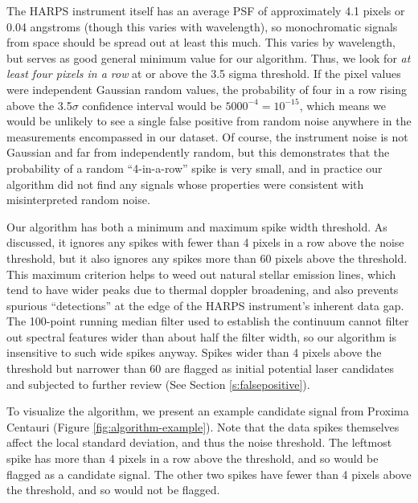 \documentclass[linenumbers]{aastex631}
\begin{document}
The HARPS instrument itself has an average PSF of approximately 4.1 pixels \citep{HARPS_specs} or 0.04 angstroms (though this varies with wavelength), so monochromatic signals from space should be spread out at least this much. This varies by wavelength, but serves as good general minimum value for our algorithm. Thus, we look for \emph{at least four pixels in a row} at or above the 3.5 sigma threshold.  If the pixel values were independent Gaussian random values, the probability of four in a row rising above the 3.5$\sigma$ confidence interval would be $5000^{-4}=10^{-15}$, which means we would be unlikely to see a single false positive from random noise anywhere in the measurements encompassed in our dataset. Of course, the instrument noise is not Gaussian and far from independently random, but this demonstrates that the probability of a random ``4-in-a-row'' spike is very small, and in practice our algorithm did not find any signals whose properties were consistent with misinterpreted random noise.

Our algorithm has both a minimum and maximum spike width threshold.  As discussed, it ignores any spikes with fewer than 4 pixels in a row above the noise threshold, but it also ignores any spikes more than 60 pixels above the threshold.  This maximum criterion helps to weed out natural stellar emission lines, which tend to have wider peaks due to thermal doppler broadening, and also prevents spurious ``detections'' at the edge of the HARPS instrument's inherent data gap. The 100-point running median filter used to establish the continuum cannot filter out spectral features wider than about half the filter width, so our algorithm is insensitive to such wide spikes anyway.  Spikes wider than 4 pixels above the threshold but narrower than 60 are flagged as initial potential laser candidates and subjected to further review (See Section \ref{s:falsepositive}).

To visualize the algorithm, we present an example candidate signal from  Proxima Centauri (Figure \ref{fig:algorithm-example}).  Note that the data spikes themselves affect the local standard deviation, and thus the noise threshold. The leftmost spike has more than 4 pixels in a row above the threshold, and so would be flagged as a candidate signal. The other two spikes have fewer than 4 pixels above the threshold, and so would not be flagged.
\end{document}
